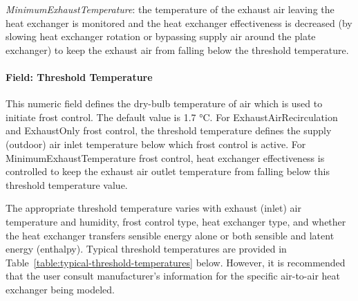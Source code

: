 \emph{MinimumExhaustTemperature}: the temperature of the exhaust air leaving the heat exchanger is monitored and the heat exchanger effectiveness is decreased (by slowing heat exchanger rotation or bypassing supply air around the plate exchanger) to keep the exhaust air from falling below the threshold temperature.

\paragraph{Field: Threshold Temperature}\label{field-threshold-temperature}

This numeric field defines the dry-bulb temperature of air which is used to initiate frost control. The default value is 1.7 °C. For ExhaustAirRecirculation and ExhaustOnly frost control, the threshold temperature defines the supply (outdoor) air inlet temperature below which frost control is active. For MinimumExhaustTemperature frost control, heat exchanger effectiveness is controlled to keep the exhaust air outlet temperature from falling below this threshold temperature value.

The appropriate threshold temperature varies with exhaust (inlet) air temperature and humidity, frost control type, heat exchanger type, and whether the heat exchanger transfers sensible energy alone or both sensible and latent energy (enthalpy). Typical threshold temperatures are provided in Table~\ref{table:typical-threshold-temperatures} below. However, it is recommended that the user consult manufacturer's information for the specific air-to-air heat exchanger being modeled.


